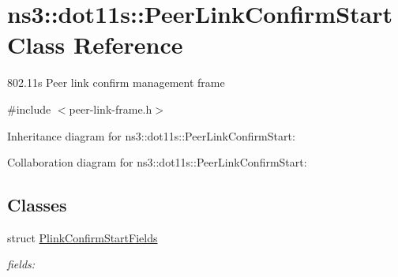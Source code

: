\hypertarget{classns3_1_1dot11s_1_1PeerLinkConfirmStart}{}\section{ns3\+:\+:dot11s\+:\+:Peer\+Link\+Confirm\+Start Class Reference}
\label{classns3_1_1dot11s_1_1PeerLinkConfirmStart}


802.\+11s Peer link confirm management frame  




{\ttfamily \#include $<$peer-\/link-\/frame.\+h$>$}



Inheritance diagram for ns3\+:\+:dot11s\+:\+:Peer\+Link\+Confirm\+Start\+:


Collaboration diagram for ns3\+:\+:dot11s\+:\+:Peer\+Link\+Confirm\+Start\+:
\subsection*{Classes}
\begin{DoxyCompactItemize}
\item 
struct \hyperlink{structns3_1_1dot11s_1_1PeerLinkConfirmStart_1_1PlinkConfirmStartFields}{Plink\+Confirm\+Start\+Fields}
\begin{DoxyCompactList}\small\item\em fields\+: \end{DoxyCompactList}\end{DoxyCompactItemize}

